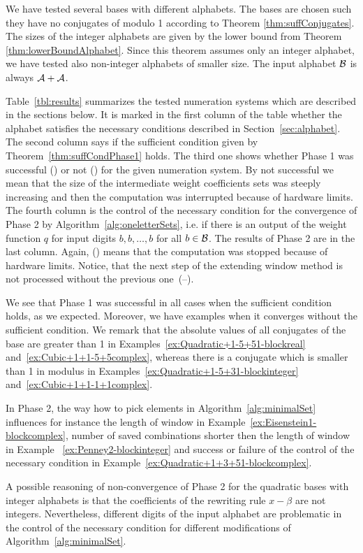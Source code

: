 We have tested several bases with different alphabets. The bases are chosen such they have no conjugates of modulo 1 according to Theorem \ref{thm:suffConjugates}. The sizes of the integer alphabets are given by the lower bound from Theorem \ref{thm:lowerBoundAlphabet}. Since this theorem assumes only an integer alphabet, we have tested also non-integer alphabets of smaller size. The input alphabet $\mathcal{B}$ is always $\mathcal{A}+ \mathcal{A}$.  

 Table~\ref{tbl:results} summarizes the tested numeration systems which are described in the sections below. It is marked in the first column of the table whether the alphabet satisfies the necessary conditions described in Section~\ref{sec:alphabet}. The second column says if the sufficient condition given by Theorem~\ref{thm:suffCondPhase1} holds. The third one shows whether Phase 1 was successful (\checkmark) or not (\xmark) for the given numeration system. By not successful we mean that the size of the intermediate weight coefficients sets was steeply increasing and then the computation was interrupted because of hardware limits. The fourth column is the control of the necessary condition for the convergence of Phase 2 by Algorithm~\ref{alg:oneletterSets}, i.e. if there is an output of the weight function $q$ for input digits $b,b,\dots,b$ for all $b\in\mathcal{B}$. The results of Phase 2 are in the last column. Again, (\xmark) means that the computation was stopped because of hardware limits. Notice, that the next step of the extending window method is not processed without the previous one~(--).

We see that Phase 1 was successful in all cases when the sufficient condition holds, as we expected. Moreover, we have examples when it converges without the sufficient condition. We remark that the absolute values of all conjugates of the base are greater than 1 in Examples~\ref{ex:Quadratic+1-5+51-blockreal} and~\ref{ex:Cubic+1+1-5+5complex}, whereas there is a conjugate which is smaller than 1 in  modulus in Examples~\ref{ex:Quadratic+1-5+31-blockinteger} and~\ref{ex:Cubic+1+1-1+1complex}.


In Phase 2, the way how to pick elements in Algorithm~\ref{alg:minimalSet} influences for instance the length of window in Example~\ref{ex:Eisenstein1-blockcomplex}, number of saved combinations shorter then the length of window in Example ~\ref{ex:Penney2-blockinteger} and success or failure of the control of the necessary condition in Example~\ref{ex:Quadratic+1+3+51-blockcomplex}.
 
A possible reasoning of non-convergence of Phase 2 for the quadratic bases with integer alphabets is that the coefficients of the rewriting rule $x-\beta$ are not integers. Nevertheless, different digits of the input alphabet are problematic in the control of the necessary condition for different modifications of Algorithm~\ref{alg:minimalSet}.

